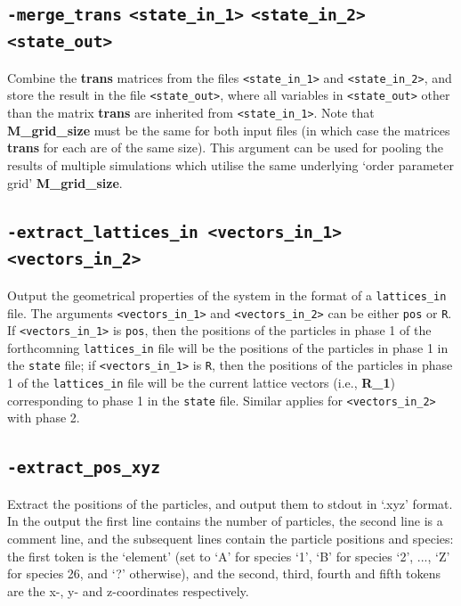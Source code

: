 \documentclass{report}
\begin{document}
\subsection{\texttt{-merge\_trans} \texttt{<state\_in\_1>}  \texttt{<state\_in\_2>} \texttt{<state\_out>}}
Combine the \textbf{trans} matrices from the files \texttt{<state\_in\_1>} and \texttt{<state\_in\_2>}, and store the result in the 
file \texttt{<state\_out>}, where all variables in \texttt{<state\_out>} other than the matrix \textbf{trans} are inherited from 
\texttt{<state\_in\_1>}. Note that \textbf{M\_grid\_size} must be the same for both input files (in which case the matrices \textbf{trans} for
each are of the same size). This argument can be used for pooling the results of multiple simulations which utilise the same underlying
`order parameter grid' \textbf{M\_grid\_size}.

\subsection{\texttt{-extract\_lattices\_in <vectors\_in\_1> <vectors\_in\_2>}}
Output the geometrical properties of the system in the format of a \texttt{lattices\_in} file. The arguments \texttt{<vectors\_in\_1>}
and \texttt{<vectors\_in\_2>} can be either \texttt{pos} or \texttt{R}. If \texttt{<vectors\_in\_1>} is \texttt{pos}, then
the positions of the particles in phase 1 of the forthcomning \texttt{lattices\_in} file will be the positions of the particles in phase 1
in the \texttt{state} file; if \texttt{<vectors\_in\_1>} is \texttt{R}, then the positions of the particles in phase 1 of the 
\texttt{lattices\_in} file will be the current lattice vectors (i.e., \textbf{R\_1}) corresponding to phase 1 in the \texttt{state} file.
Similar applies for \texttt{<vectors\_in\_2>} with phase 2.

\subsection{\texttt{-extract\_pos\_xyz}}
Extract the positions of the particles, and output them to stdout in `.xyz' format. In the output the first line contains the number of 
particles, the second line is a comment line, and the subsequent lines contain the particle positions and species: the first token is 
the `element' (set to `A' for species `1', `B' for species `2', ..., `Z' for species 26, and `?' otherwise), and the second, third, 
fourth and fifth tokens are the x-, y- and z-coordinates respectively.
\end{document}
